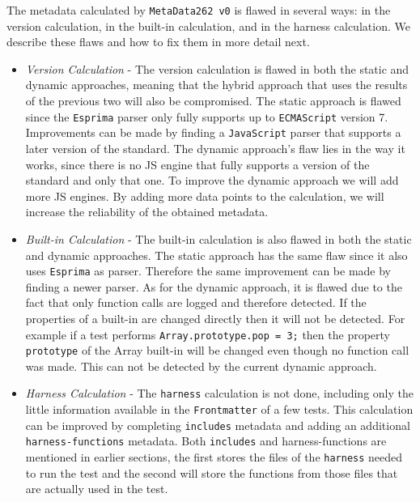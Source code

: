 \documentclass[runningheads]{llncs}
\begin{document}
The metadata calculated by \texttt{MetaData262 v0} is flawed in several ways: in the version calculation, in the built-in calculation, and in the harness calculation. We describe these flaws and how to fix them in more detail next.

\begin{itemize}
\item \emph{Version Calculation} - The version calculation is flawed in both the static and dynamic approaches, meaning that the hybrid approach that uses the results of the previous two will also be compromised. The static approach is flawed since the \texttt{Esprima} parser only fully supports up to \texttt{ECMAScript} version 7. Improvements can be made by finding a \texttt{JavaScript} parser that supports a later version of the standard. The dynamic approach's flaw lies in the way it works, since there is no JS engine that fully supports a version of the standard and only that one. To improve the dynamic approach we will add more JS engines. By adding more data points to the calculation, we will increase the reliability of the obtained metadata.
%
\item \emph{Built-in Calculation} - The built-in calculation is also flawed in both the static and dynamic approaches. The static approach has the same flaw since it also uses \texttt{Esprima} as parser. Therefore the same improvement can be made by finding a newer parser. As for the dynamic approach, it is flawed due to the fact that only function calls are logged and therefore detected. If the properties of a built-in are changed directly then it will not be detected. For example if a test performs \texttt{Array.prototype.pop = 3;} then the property \texttt{prototype} of the Array built-in will be changed even though no function call was made. This can not be detected by the current dynamic approach.
%
\item \emph{Harness Calculation} - The \texttt{harness} calculation is not done, including only the little information available in the \texttt{Frontmatter} of a few tests. This calculation can be improved by completing \texttt{includes} metadata and adding an additional \texttt{harness-functions} metadata. Both \texttt{includes} and harness-functions are mentioned in earlier sections, the first stores the files of the \texttt{harness} needed to run the test and the second will store the functions from those files that are actually used in the test.
\end{itemize}
\end{document}
